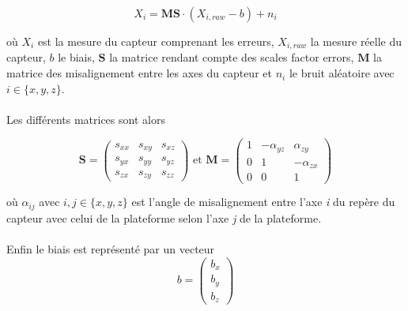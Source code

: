 \begin{displaymath}

	X_i = \textbf{M} \textbf{S} \cdot \left( X_{i,raw} - b \right) + n_i
	
\end{displaymath}

o\`u $X_i$ est la mesure du capteur comprenant les erreurs, $X_{i, raw}$ la mesure r\'eelle du capteur,  $b$ le biais,  $\textbf{S}$ la matrice rendant compte des scales factor errors, $\textbf{M}$ la matrice des misalignement entre les axes du capteur et $n_i$ le bruit al\'eatoire avec $i \in \{x,y,z\}$.
\\
\\
Les diff\'erents matrices sont alors 

\begin{displaymath}

	\textbf{S} = 
	
	\begin{pmatrix}
	
		s_{xx} & s_{xy} & s_{xz} \\
		
		s_{yx} & s_{yy} & s_{yz} \\
		
		s_{zx} & s_{zy} & s_{zz} 
		
	\end{pmatrix} 
	
	\text{ et } \textbf{M} = 
	
	\begin{pmatrix}
	
	   1 & -\alpha_{yz} & \alpha_{zy} \\
	
	   0 & 1 & -\alpha_{zx} \\
	
	   0 & 0 & 1 
	
	\end{pmatrix} 
	
\end{displaymath} 

o\`u $\alpha_{ij}$ avec $i,j \in \{x,y,z\}$ est l'angle de misalignement entre l'axe \emph{i} du rep\`ere du capteur avec celui de la plateforme selon l'axe \emph{j} de la plateforme.
\\
\\
Enfin le biais est repr\'esent\'e par un vecteur 
\begin{displaymath} 

	b = 
	
	\begin{pmatrix}
	
		b_x\\
		
		b_y \\
		
		b_z
		
	\end{pmatrix}
	
\end{displaymath} 


